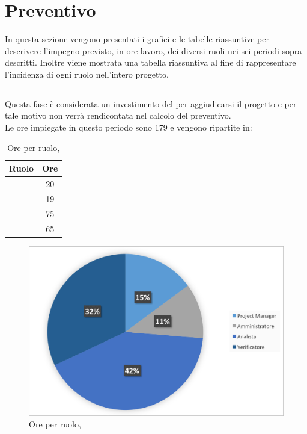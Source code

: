 \newpage
\section{Preventivo}
In questa sezione vengono presentati i grafici e le tabelle riassuntive per descrivere l'impegno previsto, in ore lavoro, dei diversi ruoli nei sei periodi sopra descritti. Inoltre viene mostrata una tabella riassuntiva al fine di rappresentare l'incidenza di ogni ruolo nell'intero progetto.

\subsection{\ARM}
Questa fase è considerata un investimento del  per aggiudicarsi il progetto e per tale motivo non verrà rendicontata nel calcolo del preventivo. \\
Le ore impiegate in questo periodo sono 179 e vengono ripartite in:

\begin{table}[h]
	\begin{center}
		\begin{tabular}{|c|c|}
			\hline
			\textbf{Ruolo}	& \textbf{Ore} \\
			\hline
			\Pm &	20\\
			\hline
			\Am	&	19\\
			\hline
			\An		&	75\\
			\hline
			\Ver	&	65\\
			\hline
		\end{tabular}
	\end{center}
	\caption{Ore per ruolo, \ARM}
\end{table}

\begin{figure}[H]
	\centering 
	\includegraphics[scale=0.7]{Immagini/GraficiTorte/ARM.png}
	\caption{Ore per ruolo, \ARM}
\end{figure}

